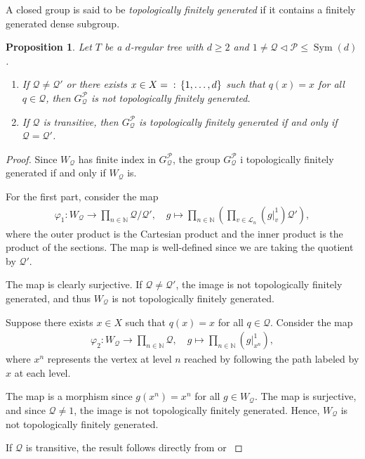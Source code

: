 \documentclass{amsart}
\def\set#1{{\def\st{\;:\;}\left\{#1\right\}}}
\def\NN{\mathbb N}
\DeclareMathOperator{\Sym}{Sym}
\DeclareMathOperator{\st}{st}
\newtheorem{Proposition}{Proposition}[section]
\begin{document}
A closed group is said to be \textit{topologically finitely generated} if it contains a finitely generated dense subgroup.

\begin{Proposition}
Let $T$ be a $d$-regular tree with $d \geq 2$ and $1 \neq \mathcal{Q} \lhd \mathcal{P} \leq \Sym(d)$.

\begin{enumerate}
\item If $\mathcal{Q} \neq \mathcal{Q}'$ or there exists $x \in X = \set{1,\dots,d}$ such that $q(x) = x$ for all $q \in \mathcal{Q}$, then $G_\mathcal{Q}^\mathcal{P}$ is not topologically finitely generated. 
\item If $\mathcal{Q}$ is transitive, then $G_\mathcal{Q}^\mathcal{P}$ is topologically finitely generated if and only if $\mathcal{Q} = \mathcal{Q}'$.
\end{enumerate}
\label{proposition: GQP tfg}
\end{Proposition}

\begin{proof}
Since $W_\mathcal{Q}$ has finite index in $G_\mathcal{Q}^\mathcal{P}$, the group $G_\mathcal{Q}^\mathcal{P}$ i topologically finitely generated if and only if $W_\mathcal{Q}$ is.

For the first part, consider the map
\begin{align*}
\varphi_1: W_\mathcal{Q} \rightarrow \prod_{n \in \NN} \mathcal{Q}/\mathcal{Q}', \quad g \mapsto \prod_{n \in \NN} \left( \prod_{v \in \mathcal{L}_n} (g|_{v}^1) \mathcal{Q}'  \right), 
\end{align*}
where the outer product is the Cartesian product and the inner product is the product of the sections. The map is well-defined since we are taking the quotient by $\mathcal{Q}'$.

The map is clearly surjective. If $\mathcal{Q} \neq \mathcal{Q}'$, the image is not topologically finitely generated, and thus $W_\mathcal{Q}$ is not topologically finitely generated. 

Suppose there exists $x \in X$ such that $q(x) = x$ for all $q \in \mathcal{Q}$. Consider the map
\begin{align*}
\varphi_2: W_\mathcal{Q} \rightarrow \prod_{n \in \NN} \mathcal{Q}, \quad g \mapsto \prod_{n \in \NN} \left( g|_{x^n}^1 \right), 
\end{align*}
where $x^n$ represents the vertex at level $n$ reached by following the path labeled by $x$ at each level. 

The map is a morphism since $g(x^n) = x^n$ for all $g \in W_\mathcal{Q}$. The map is surjective, and since $\mathcal{Q} \neq 1$, the image is not topologically finitely generated. Hence, $W_\mathcal{Q}$ is not topologically finitely generated.

If $\mathcal{Q}$ is transitive, the result follows directly from \cite[Corollary 3]{RadiFiniteType2025} or \cite[Theorem 1]{Bondarenko2010} 
\end{proof}
\end{document}
